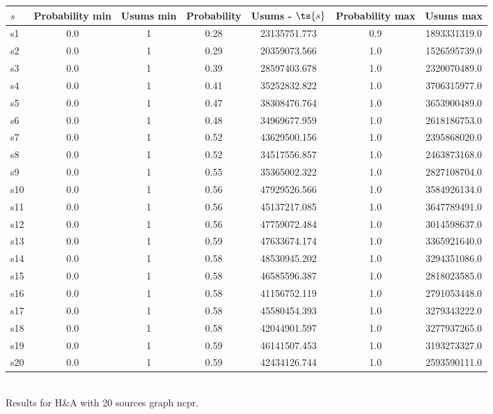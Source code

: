 \documentclass{article}
\begin{document}
\noindent\begin{tabular}{|l|c|c|c|c|c|c|}
\hline
$s$& Probability min & Usums min & Probability & Usums - $\ts{s}$ & Probability max & Usums max\\
\hline
s1 &0.0 & 1 & 0.28 & 23135751.773 & 0.9 & 1893331319.0\\
\hline
s2 &0.0 & 1 & 0.29 & 20359073.566 & 1.0 & 1526595739.0\\
\hline
s3 &0.0 & 1 & 0.39 & 28597403.678 & 1.0 & 2320070489.0\\
\hline
s4 &0.0 & 1 & 0.41 & 35252832.822 & 1.0 & 3706315977.0\\
\hline
s5 &0.0 & 1 & 0.47 & 38308476.764 & 1.0 & 3653900489.0\\
\hline
s6 &0.0 & 1 & 0.48 & 34969677.959 & 1.0 & 2618186753.0\\
\hline
s7 &0.0 & 1 & 0.52 & 43629500.156 & 1.0 & 2395868020.0\\
\hline
s8 &0.0 & 1 & 0.52 & 34517556.857 & 1.0 & 2463873168.0\\
\hline
s9 &0.0 & 1 & 0.55 & 35365002.322 & 1.0 & 2827108704.0\\
\hline
s10 &0.0 & 1 & 0.56 & 47929526.566 & 1.0 & 3584926134.0\\
\hline
s11 &0.0 & 1 & 0.56 & 45137217.085 & 1.0 & 3647789491.0\\
\hline
s12 &0.0 & 1 & 0.56 & 47759072.484 & 1.0 & 3014598637.0\\
\hline
s13 &0.0 & 1 & 0.59 & 47633674.174 & 1.0 & 3365921640.0\\
\hline
s14 &0.0 & 1 & 0.58 & 48530945.202 & 1.0 & 3294351086.0\\
\hline
s15 &0.0 & 1 & 0.58 & 46585596.387 & 1.0 & 2818023585.0\\
\hline
s16 &0.0 & 1 & 0.58 & 41156752.119 & 1.0 & 2791053448.0\\
\hline
s17 &0.0 & 1 & 0.58 & 45580454.393 & 1.0 & 3279343222.0\\
\hline
s18 &0.0 & 1 & 0.58 & 42044901.597 & 1.0 & 3277937265.0\\
\hline
s19 &0.0 & 1 & 0.59 & 46141507.453 & 1.0 & 3193273327.0\\
\hline
s20 &0.0 & 1 & 0.59 & 42434126.744 & 1.0 & 2593590111.0\\
\hline
\end{tabular}\\

\noindent Results for H\&A with 20 sources graph ncpr.
\end{document}
